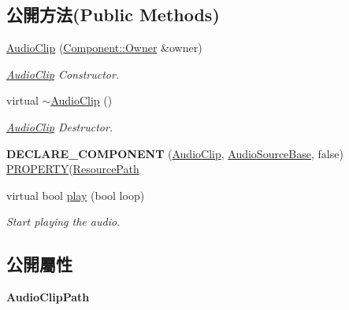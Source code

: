 \subsection*{公開方法(Public Methods)}
\begin{DoxyCompactItemize}
\item 
\hyperlink{class_magnum_1_1_audio_clip_a7e20cfc43c6a9e0ff5881b283888044b}{Audio\+Clip} (\hyperlink{class_magnum_1_1_component_1_1_owner}{Component\+::\+Owner} \&owner)
\begin{DoxyCompactList}\small\item\em \hyperlink{class_magnum_1_1_audio_clip}{Audio\+Clip} Constructor. \end{DoxyCompactList}\item 
virtual \hyperlink{class_magnum_1_1_audio_clip_ab929796e463c51c50f2ad4e9acec35da}{$\sim$\+Audio\+Clip} ()
\begin{DoxyCompactList}\small\item\em \hyperlink{class_magnum_1_1_audio_clip}{Audio\+Clip} Destructor. \end{DoxyCompactList}\item 
{\bfseries D\+E\+C\+L\+A\+R\+E\+\_\+\+C\+O\+M\+P\+O\+N\+E\+NT} (\hyperlink{class_magnum_1_1_audio_clip}{Audio\+Clip}, \hyperlink{class_magnum_1_1_audio_source_base}{Audio\+Source\+Base}, false) \hyperlink{class_magnum_1_1_component_a30a9f5cf6e5c94519c752f30ac3c6013}{P\+R\+O\+P\+E\+R\+TY}(\hyperlink{class_magnum_1_1_resource_path}{Resource\+Path}\hypertarget{class_magnum_1_1_audio_clip_a24b7eed66ea0a310eaee5b767ca0c394}{}\label{class_magnum_1_1_audio_clip_a24b7eed66ea0a310eaee5b767ca0c394}

\item 
virtual bool \hyperlink{class_magnum_1_1_audio_clip_a321057b7eee920588da25754380af705}{play} (bool loop)
\begin{DoxyCompactList}\small\item\em Start playing the audio. \end{DoxyCompactList}\end{DoxyCompactItemize}
\subsection*{公開屬性}
\begin{DoxyCompactItemize}
\item 
{\bfseries Audio\+Clip\+Path}\hypertarget{class_magnum_1_1_audio_clip_afb483bc8ee463077d3ed1b436ebe348e}{}\label{class_magnum_1_1_audio_clip_afb483bc8ee463077d3ed1b436ebe348e}

\end{DoxyCompactItemize}
